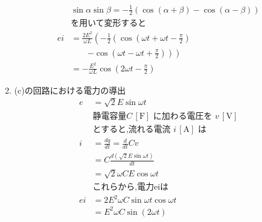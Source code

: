 \documentclass[twocolumn]{article}
\begin{document}
\begin{enumerate}
\begin{align*}
                         & \sin\alpha \sin \beta = -\frac{1}{2} \left( \cos \left(\alpha + \beta\right) - \cos \left(\alpha - \beta\right) \right) \\
                         & \text{を用いて変形すると}                                                                                                        \\
          ei             & = \frac{2E^2}{\omega L} \left(- \frac{1}{2} \left(\cos\left(\omega t + \omega t - \frac{\pi}{2}\right) \right. \right.  \\
                         & \qquad\left.\left. - \cos\left(\omega t - \omega t + \frac{\pi}{2}\right)
          \right) \right)                                                                                                                          \\
                         & = -\frac{E^2}{\omega L} \cos \left(2\omega t - \frac{\pi}{2}\right)
        \end{align*}

  \item (c)の回路における電力の導出
        \begin{align*}
          e  & =\sqrt{2}E\sin\omega t                                   \\
             & \text{静電容量} C\,[\text{F}] \text{ に加わる電圧を } v\,[\text{V}] \\
             & \text{とすると,流れる電流 } i\,[\text{A}] \text{ は}               \\
          i  & = \frac{dq}{dt} = \frac{d}{dt}Cv                         \\
             & = C \frac{d \left(\sqrt{2}E\sin \omega t\right)}{dt}     \\
             & = \sqrt{2}\omega CE\cos\omega t                          \\
             & \text{これらから,電力eiは}                                       \\
          ei & = 2E^2 \omega C \sin\omega t \cos \omega t               \\
             & = E^2 \omega C \sin \left(2 \omega t\right)              \\
        \end{align*}


\end{enumerate}
\end{document}
